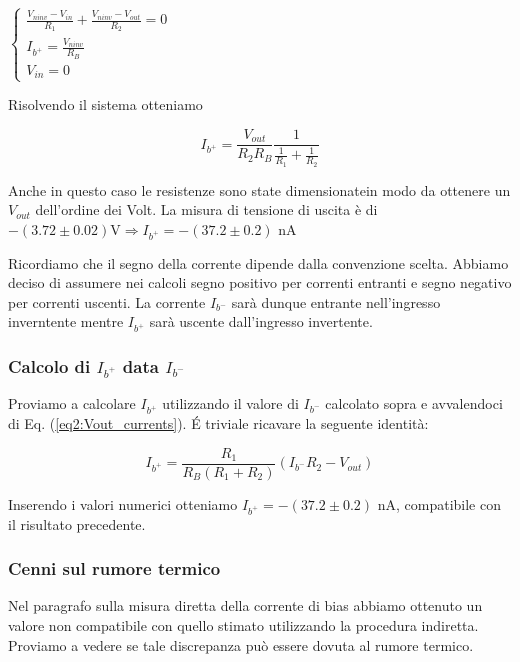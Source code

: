 $\begin{cases}\frac{V_{ninv} - V_{in}}{R_1} + \frac{V_{ninv}-V_{out}}{R_2}=0 \\ I_{b^+}=\frac{V_{ninv}}{R_B}\\ V_{in}=0 \end{cases}$

Risolvendo il sistema otteniamo


\begin{equation}
I_{b^+}=\frac{V_{out}}{R_2 R_B}\frac{1}{\frac{1}{R_1}+\frac{1}{R_2}}
\label{eq2:corrente_noninv}
\end{equation}

Anche in questo caso le resistenze sono state dimensionatein modo da ottenere un $V_{out}$ dell'ordine dei Volt. La misura di tensione di uscita è di $-(3.72 \pm 0.02) \si{\volt} \Rightarrow I_{b^+} = - (37.2 \pm 0.2)$ \si{\nano\ampere}

Ricordiamo che il segno della corrente dipende dalla convenzione scelta. Abbiamo deciso di assumere nei calcoli segno positivo per correnti entranti e segno negativo per correnti uscenti. La corrente $I_{b^-}$ sarà dunque entrante nell'ingresso inverntente mentre $I_{b^+}$ sarà uscente dall'ingresso invertente.


\subsubsection*{Calcolo di $I_{b^+}$ data $I_{b^-}$}

Proviamo a calcolare $I_{b^+}$ utilizzando il valore di $I_{b^-}$ calcolato sopra e avvalendoci di Eq. (\ref{eq2:Vout_currents}). \'E triviale ricavare la seguente identità: 

$$I_{b^+} = \frac{R_1}{R_B(R_1+R_2)}(I_{b^-} R_2-V_{out})$$

Inserendo i valori numerici otteniamo $I_{b^+} = - (37.2 \pm 0.2)$ \si{\nano\ampere}, compatibile con il risultato precedente.


\subsubsection*{Cenni sul rumore termico}
Nel paragrafo sulla misura diretta della corrente di bias abbiamo ottenuto un valore non compatibile con quello stimato utilizzando la procedura indiretta. Proviamo a vedere se tale discrepanza può essere dovuta al rumore termico.
 
